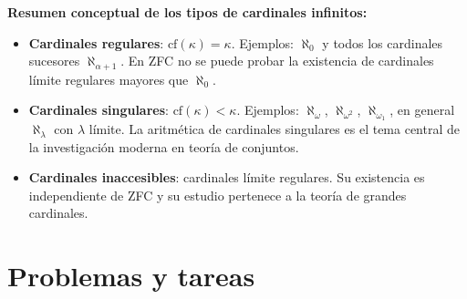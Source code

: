 \begin{importante}
\textbf{Resumen conceptual de los tipos de cardinales infinitos:}
\begin{itemize}[leftmargin=2em]
  \item \textbf{Cardinales regulares}: $\mathrm{cf}(\kappa) = \kappa$. Ejemplos: $\aleph_0$ y todos los cardinales sucesores $\aleph_{\alpha+1}$. En ZFC no se puede probar la existencia de cardinales límite regulares mayores que $\aleph_0$.
  \item \textbf{Cardinales singulares}: $\mathrm{cf}(\kappa) < \kappa$. Ejemplos: $\aleph_\omega$, $\aleph_{\omega^2}$, $\aleph_{\omega_1}$, en general $\aleph_\lambda$ con $\lambda$ límite. La aritmética de cardinales singulares es el tema central de la investigación moderna en teoría de conjuntos.
  \item \textbf{Cardinales inaccesibles}: cardinales límite regulares. Su existencia es independiente de ZFC y su estudio pertenece a la teoría de grandes cardinales.
\end{itemize}
\end{importante}

\section{Problemas y tareas}

